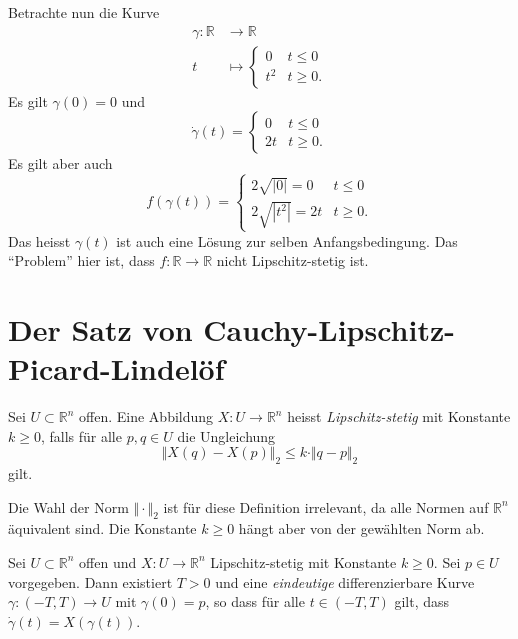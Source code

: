 \documentclass[../main.tex]{subfiles}
\begin{document}
\begin{examples}
\begin{enumerate}[(1)]
      Betrachte nun die Kurve
      \begin{align*}
        \gamma \colon \mathbb{R} & \to \mathbb{R} \\
        t & \mapsto 
        \begin{cases}
          0 & t \leq 0 \\
          t^2 & t \geq 0.
        \end{cases}
      \end{align*}
      Es gilt $\gamma(0) = 0$ und
      \[
        \dot \gamma(t) =
        \begin{cases}
          0 & t \leq 0 \\
          2t & t \geq 0.
        \end{cases}
      \]
      Es gilt aber auch
      \[
        f(\gamma(t)) =
        \begin{cases}
          2 \sqrt{|0|} = 0 & t \leq 0 \\
          2 \sqrt{|t^2|} = 2t & t \geq 0.
        \end{cases}
      \]
      Das heisst $\gamma(t)$ ist auch eine Lösung
      zur selben Anfangsbedingung.
      Das ``Problem'' hier ist,
      dass $f \colon \mathbb{R} \to \mathbb{R}$ 
      nicht Lipschitz-stetig ist.
  \end{enumerate}
\end{examples}

\section{Der Satz von Cauchy-Lipschitz-Picard-Lindelöf}
\begin{definition}
  Sei $U \subset \mathbb{R}^n$ offen.
  Eine Abbildung $X \colon U \to \mathbb{R}^n$ 
  heisst \emph{Lipschitz-stetig} mit Konstante
  $k \geq 0$, falls für alle $p, q \in U$ 
  die Ungleichung
  \[
    \Vert X(q) - X(p) \Vert_2 \leq k \cdot \Vert q - p \Vert_2
  \]
  gilt.
\end{definition}

\begin{remark}
  Die Wahl der Norm $\Vert \cdot \Vert_2$ ist für diese
  Definition irrelevant,
  da alle Normen auf $\mathbb{R}^n$ äquivalent sind.
  Die Konstante $k \geq 0$ hängt aber von der gewählten
  Norm ab.
\end{remark}

\begin{theorem*}
  Sei $U \subset \mathbb{R}^n$ offen
  und $X \colon U \to \mathbb{R}^n$ Lipschitz-stetig
  mit Konstante $k \geq 0$.
  Sei $p \in U$ vorgegeben.
  Dann existiert $T > 0$ und eine \emph{eindeutige}
  differenzierbare Kurve
  $\gamma \colon (-T, T) \to U$ mit $\gamma(0) = p$,
  so dass für alle $t \in (-T, T)$ gilt, dass
  $\dot \gamma(t) = X(\gamma(t))$.
\end{theorem*}
\end{document}
